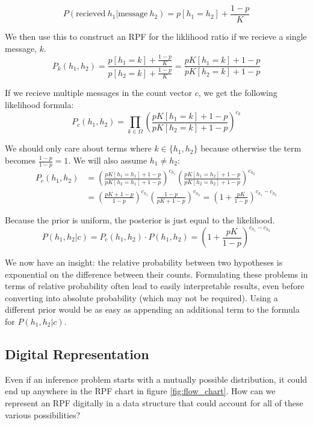 \documentclass[twoside]{article}
\theoremstyle{plain}%
\theoremstyle{definition}
\theoremstyle{remark}
\begin{document}
\[P(\text{recieved}\: h_1 | \text{message}\: h_2) = p[h_1 = h_2] + \frac{1-p}{K}\]
 
We then use this to construct an RPF for the liklihood ratio if we recieve a single message, \(k\).
\[P_k(h_1, h_2) = \frac{p[h_1 = k] + \frac{1-p}{K}}{p[h_2 = k] + \frac{1-p}{K}} = \frac{pK[h_1 = k] + 1-p}{pK[h_2 = k] + 1-p}\]

If we recieve multiple messages in the count vector \(c\), we get the following likelihood formula:
\[P_c(h_1, h_2) = \prod_{k \in \Omega}\left(\frac{pK[h_1 = k] + 1-p}{pK[h_2 = k] + 1-p}\right)^{c_k}\]

We should only care about terms where \(k \in \{h_1, h_2\}\) because otherwise the term becomes \(\frac{1-p}{1-p} = 1\). We will also assume \(h_1 \neq h_2\):
\begin{equation}
\begin{aligned}
P_c(h_1, h_2) &= \left(\frac{pK[h_1 = h_1] + 1-p}{pK[h_2 = h_1] + 1-p}\right)^{c_{h_1}} \left(\frac{pK[h_1 = h_2] + 1-p}{pK[h_2 = h_2] + 1-p}\right)^{c_{h_2}} \\
& = \left(\frac{pK + 1-p}{1-p}\right)^{c_{h_1}} \left(\frac{1-p}{pK + 1-p}\right)^{c_{h_2}} = \left(1 + \frac{pK}{1-p}\right)^{c_{h_1} - c_{h_2}}
\end{aligned}
\end{equation}

Because the prior is uniform, the posterior is just equal to the likelihood.
\[P(h_1, h_2 | c) = P_c(h_1, h_2) \cdot P(h_1, h_2) = \left(1 + \frac{pK}{1-p}\right)^{c_{h_1} - c_{h_2}} \]

We now have an insight: the relative probability between two hypotheses is exponential on the difference between their counts. Formulating these problems in terms of relative probability often lead to easily interpretable results, even before converting into absolute probability (which may not be required). Using a different prior would be as easy as appending an additional term to the formula for \(P(h_1, h_2|c)\).

\subsection{Digital Representation}

Even if an inference problem starts with a mutually possible distribution, it could end up anywhere in the RPF chart in figure \ref{fig:flow_chart}. How can we represent an RPF digitally in a data structure that could account for all of these various possibilities?
\end{document}
